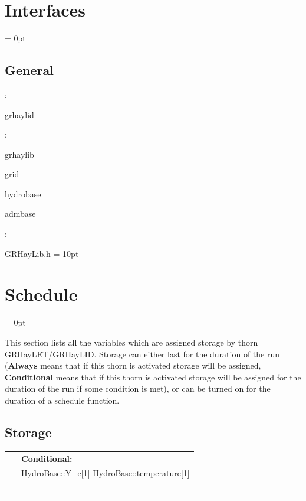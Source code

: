 \documentclass{article}
\begin{document}
\section{Interfaces} 


\parskip = 0pt

\vspace{3mm} \subsection*{General}

: 

grhaylid
\vspace{2mm}

: 

grhaylib

grid

hydrobase

admbase
\vspace{2mm}

\vspace{5mm}

: 

GRHayLib.h
\vspace{2mm}\parskip = 10pt 

\section{Schedule} 


\parskip = 0pt


\noindent This section lists all the variables which are assigned storage by thorn GRHayLET/GRHayLID.  Storage can either last for the duration of the run ({\bf Always} means that if this thorn is activated storage will be assigned, {\bf Conditional} means that if this thorn is activated storage will be assigned for the duration of the run if some condition is met), or can be turned on for the duration of a schedule function.


\subsection*{Storage}

\hspace{5mm}

 \begin{tabular*}{160mm}{ll} 
~& {\bf Conditional:} \\ 
~ &  HydroBase::Y\_e[1] HydroBase::temperature[1]\\ 
~ & ~\\ 
\end{tabular*} 
\end{document}

